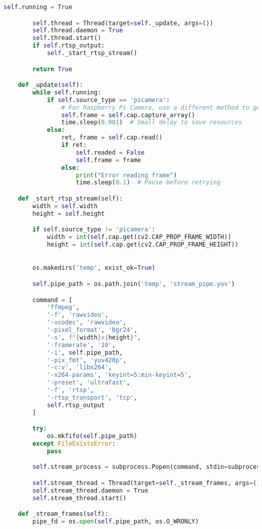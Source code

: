 \begin{lstlisting}[language=Python]
        self.running = True

        self.thread = Thread(target=self._update, args=())
        self.thread.daemon = True
        self.thread.start()
        if self.rtsp_output:
            self._start_rtsp_stream()

        return True

    def _update(self):
        while self.running:
            if self.source_type == 'picamera':
                # For Raspberry Pi Camera, use a different method to get the frame
                self.frame = self.cap.capture_array()
                time.sleep(0.001)  # Small delay to save resources
            else:
                ret, frame = self.cap.read()
                if ret:
                    self.readed = False
                    self.frame = frame
                else:
                    print("Error reading frame")
                    time.sleep(0.1)  # Pause before retrying

    def _start_rtsp_stream(self):
        width = self.width
        height = self.height

        if self.source_type != 'picamera':
            width = int(self.cap.get(cv2.CAP_PROP_FRAME_WIDTH))
            height = int(self.cap.get(cv2.CAP_PROP_FRAME_HEIGHT))

       
        os.makedirs('temp', exist_ok=True)

        self.pipe_path = os.path.join('temp', 'stream_pipe.yuv')

        command = [
            'ffmpeg',
            '-f', 'rawvideo',
            '-vcodec', 'rawvideo',
            '-pixel_format', 'bgr24',
            '-s', f"{width}x{height}",
            '-framerate', '10',
            '-i', self.pipe_path,
            '-pix_fmt', 'yuv420p',
            '-c:v', 'libx264',
            '-x264-params', 'keyint=5:min-keyint=5',
            '-preset', 'ultrafast',
            '-f', 'rtsp',
            '-rtsp_transport', 'tcp',
            self.rtsp_output
        ]

        try:
            os.mkfifo(self.pipe_path)
        except FileExistsError:
            pass

        self.stream_process = subprocess.Popen(command, stdin=subprocess.PIPE)

        self.stream_thread = Thread(target=self._stream_frames, args=())
        self.stream_thread.daemon = True
        self.stream_thread.start()

    def _stream_frames(self):
        pipe_fd = os.open(self.pipe_path, os.O_WRONLY)


\end{lstlisting}
